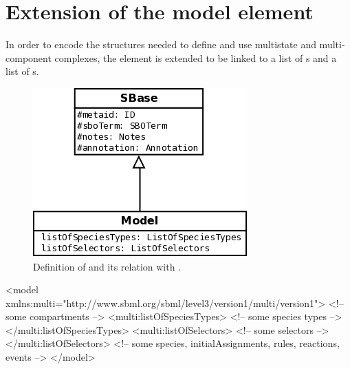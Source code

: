 \section{Extension of the model element}

In order to encode the structures needed to define and use multistate and multi-component complexes, the element  is extended to be linked to a list of s and a list of s.

\begin{figure}[H]
\begin{center}
\includegraphics[scale=0.3]{figs/pngs/ModelClass.png} 
\caption{Definition of  and its relation with .}
\label{fig:Model}
\end{center}
\end{figure}

\begin{example}
<model xmlns:multi="http://www.sbml.org/sbml/level3/version1/multi/version1">
  <!-- some compartments -->
  <multi:listOfSpeciesTypes>
    <!-- some species types -->
  </multi:listOfSpeciesTypes>
  <multi:listOfSelectors>
    <!-- some selectors -->
  </multi:listOfSelectors>
  <!-- some species, initialAssignments, rules,  reactions, events -->
</model>
\end{example}